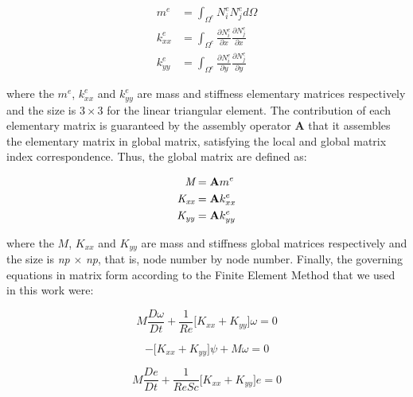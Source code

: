 \begin{equation}
 \begin{aligned}
  m^{e} & = \int_{\Omega^{e}} N_{i}^{e} N_{j}^{e} d\Omega \\
  k_{xx}^{e} & = \int_{\Omega^{e}} \frac{\partial N_{i}^{e}}{\partial x} \frac{\partial N_{j}^{e}}{\partial x} \\
  k_{yy}^{e} & = \int_{\Omega^{e}} \frac{\partial N_{i}^{e}}{\partial y} \frac{\partial N_{j}^{e}}{\partial y}
 \end{aligned}
\end{equation}

\medskip
\noindent
where the
$m^{e}$,
$k^{e}_{xx}$ and
$k^{e}_{yy}$
are mass and stiffness elementary matrices respectively and
the size is $3 \times 3$ for the linear triangular element.
The contribution of each elementary matrix is guaranteed by
the assembly operator \textbf{A}
that it assembles the elementary matrix in
global matrix, satisfying the local and global matrix index
correspondence. Thus, the global matrix are defined as:


\begin{align}
  \textit{M} & = \textbf{A} m^{e}\\
  \textit{K\textsubscript{xx}} & = \textbf{A} k_{xx}^{e} \\
  \textit{K\textsubscript{yy}} & = \textbf{A} k_{yy}^{e}
\end{align}


\medskip
\noindent
where the
$M$,
$K_{xx}$ and
$K_{yy}$
are mass and stiffness global matrices respectively and
the size is \textit{np} $\times$ \textit{np}, that is,
node number by node number. 
Finally, the governing equations in matrix form according to 
the Finite Element Method that we used in this work were:


\begin{equation}
 M \frac{D \omega}{Dt} 
 + \frac{1}{\textit{Re}} \Big[ K_{xx} + K_{yy} \Big] \omega
 = 0 \label{vorticity matrix}
\end{equation}

\begin{equation}
 - \Big[ K_{xx} + K_{yy} \Big] \psi + M \omega = 0 \label{stream matrix}
\end{equation}

\begin{equation}
 M \frac{De}{Dt} 
 + \frac{1}{\textit{ReSc}} \Big[ K_{xx} + K_{yy} \Big] e
 = 0 \label{concentration matrix}
\end{equation}


